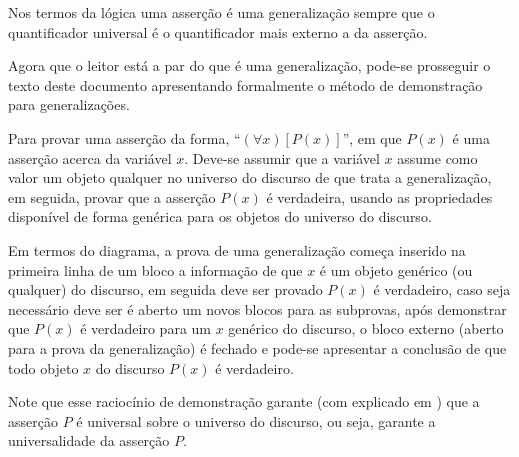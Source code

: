 Nos termos da lógica uma asserção é uma generalização sempre que o quantificador universal é o quantificador mais externo a da asserção. 

Agora que o leitor está a par do que é uma generalização, pode-se prosseguir o texto deste documento apresentando formalmente o método de demonstração para generalizações.

\begin{definicao}
	Para provar uma asserção da forma, ``$(\forall x)[P(x)]$'', em que $P(x)$ é uma asserção acerca da variável $x$. Deve-se assumir que a variável $x$ assume como valor um objeto qualquer no universo do discurso de que trata a  generalização, em seguida, provar que a asserção $P(x)$ é verdadeira, usando as propriedades disponível de forma genérica para os objetos do universo do discurso.
\end{definicao}

Em termos do diagrama, a prova de uma generalização começa inserido na primeira linha de um bloco a informação de que $x$ é um objeto genérico (ou qualquer) do discurso, em seguida deve ser provado $P(x)$ é verdadeiro, caso seja necessário deve ser é aberto um novos blocos para as subprovas, após demonstrar que $P(x)$ é verdadeiro para um $x$ genérico do discurso, o bloco externo (aberto para a prova da generalização) é fechado e  pode-se apresentar a conclusão de que todo objeto $x$ do discurso $P(x)$ é verdadeiro. 

Note que esse raciocínio de demonstração garante (com explicado em \cite{velleman2019comProvar}) que a asserção $P$ é universal sobre o universo do discurso, ou seja, garante a universalidade da asserção $P$.


